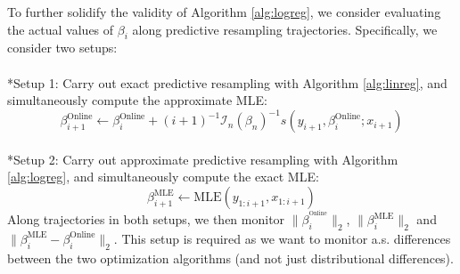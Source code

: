\documentclass[11pt,a4paper]{article}
\makeatletter
\let\oldparagraph\paragraph
\renewcommand{\paragraph}{
    \@ifstar
      \xxxParagraphStar
      \xxxParagraphNoStar
  }
\newcommand{\xxxParagraphStar}[1]{\oldparagraph*{#1}\mbox{}}
\newcommand{\xxxParagraphNoStar}[1]{\oldparagraph{#1}\mbox{}}
\theoremstyle{plain}
\theoremstyle{remark}
\theoremstyle{remark}
\makeatother
\begin{document}
To further solidify the validity of Algorithm \ref{alg:logreg}, we consider evaluating the actual values of $\beta_i$ along predictive resampling trajectories. Specifically, we consider two setups:
\paragraph*{Setup 1:} Carry out exact predictive resampling with Algorithm \ref{alg:linreg}, and simultaneously compute the approximate MLE:
   $${\beta}^{\text{Online}}_{i+1} \gets {\beta}_{i}^{\text{Online}} + (i+1)^{-1}\mathcal{I}_n(\beta_n)^{-1}s(y_{i+1}, {\beta}_{i}^{\text{Online}}; x_{i+1})
$$
\paragraph*{Setup 2:} Carry out approximate predictive resampling with Algorithm \ref{alg:logreg}, and simultaneously compute the exact MLE:
   $${\beta}^{\text{MLE}}_{i+1} \gets \text{MLE}(y_{1:i+1}, x_{1:i+1})
$$
Along trajectories in both setups, we then monitor $\|\beta_i^{^{\text{Online}}}\|_2$, $\|{\beta}_i^{\text{MLE}}\|_2$ and $\|\beta_i^{\text{MLE}} - {\beta}_i^{\text{Online}}\|_2$. This setup is required as we want to monitor a.s. differences between the two optimization algorithms (and not just distributional differences).
\end{document}

